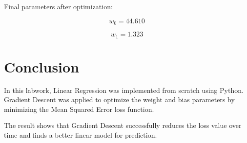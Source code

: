 \documentclass{article}
\begin{document}
Final parameters after optimization:

\[
w_0 = 44.610
\]

\[
w_1 = 1.323
\]

\section{Conclusion}

In this labwork, Linear Regression was implemented from scratch using Python. Gradient Descent was applied to optimize the weight and bias parameters by minimizing the Mean Squared Error loss function.

The result shows that Gradient Descent successfully reduces the loss value over time and finds a better linear model for prediction.
\end{document}
